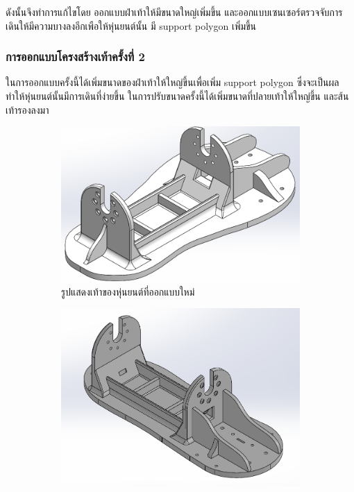 ดังนั้นจึงทำการแก้ไขโดย ออกแบบฝ่าเท้าให้มีขนาดใหญ่เพิ่มขึ้น และออกแบบเซนเซอร์ตรวจจับการเดินให้มีความบางลงอีกเพือให้หุ่นยนต์นั้น
มี support polygon เพิ่มขึ้น

\clearpage
\subsubsection{การออกแบบโครงสร้างเท้าครั้งที่ 2}
ในการออกแบบครั้งนี้ได้เพิ่มขนาดของฝ่าเท้าให้ใหญ่ขึ้นเพื่อเพิ่ม support polygon ซึ่งจะเป็นผลทำให้หุ่นยนต์นั้นมีการเดินที่ง่ายขึ้น
ในการปรับขนาดครั้งนี้ได้เพิ่มขนาดที่ปลายเท้าให้ใหญ่ขึ้น และส้นเท้ารองลงมา
\begin{figure}[!ht]
  \centering
  \begin{subfigure}[b]{0.4\linewidth}
    \includegraphics[width=\linewidth]{chapter4/images/foot_new.PNG}
    \caption{รูปแสดงเท้าของหุ่นยนต์ที่ออกแบบใหม่}
  \end{subfigure}
  \begin{subfigure}[b]{0.4\linewidth}
    \includegraphics[width=\linewidth]{chapter4/images/foot_old.PNG}

\end{subfigure}
\end{figure}
